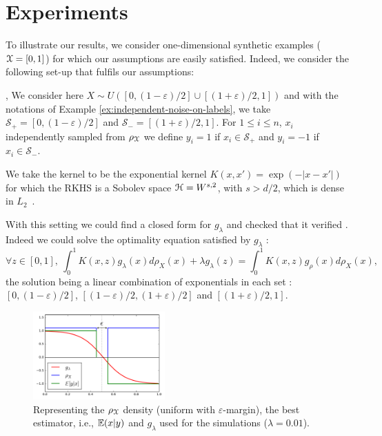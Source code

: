 \section{Experiments} \label{ap:experiments}

To illustrate our results, we consider one-dimensional synthetic examples (${\mathcal X} = [0,1] $) for which our assumptions are easily satisfied. 
Indeed, we consider the following set-up that fulfils our assumptions: 
\BIT
\item {},  We consider here $X \sim U\left([0,(1-\varepsilon)/2] \cup [(1+\varepsilon)/2,1]  \right)$ and with the notations of Example \ref{ex:independent-noise-on-labels}, we take $\mathcal{S}_+ = [0,(1-\varepsilon)/2]$ and $\mathcal{S}_- = [(1+\varepsilon)/2,1]$. For $1 \leq i \leq n$,  $x_i$ independently sampled from ${\rho_{{\mathcal X}}}$ we define $y_i = 1 $ if $x_i \in \mathcal{S}_+$ and $y_i = -1 $ if $x_i \in \mathcal{S}_-$.

\item {} We take the kernel to be the exponential  kernel $K(x,x') = \exp(-|x-x'|)$ for which the RKHS is a Sobolev space ${\mathcal H} = W^{s,2}$, with $s > d/2$, which is dense in $L_2$~\citep{adams2003sobolev}.

\item {} With this setting we could find a closed form for $g_\lambda$ and checked that it verified . Indeed we could solve the optimality equation satisfied by $g_\lambda$ : $$ \forall z \in [0,1], \ \int_{0}^1 K(x,z)g_\lambda(x) d\rho_X(x) + \lambda g_\lambda(z) = \int_{0}^1 K(x,z)g_\rho(x) d\rho_X(x),  $$ the solution being a linear combination of exponentials in each set : $[0,(1-\varepsilon)/2]$, $[(1-\varepsilon)/2,(1+\varepsilon)/2]$ and $[(1+\varepsilon)/2,1]$.
\EIT

\begin{figure}[ht]
    \centering
    \includegraphics[width=0.45\textwidth]{figures/zbis_densities.pdf}
    \caption{Representing the $\rho_{\mathcal X}$ density (uniform with $\varepsilon$-margin), the best estimator, i.e., ${\mathbb E} (x|y)$ and $g_\lambda$ used for the simulations ($\lambda = 0.01$).}
    \label{fig:densities}
\end{figure}

